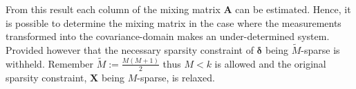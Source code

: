 From this result each column of the mixing matrix $\mathbf{A}$ can be estimated. 
Hence, it is possible to determine the mixing matrix in the case where the measurements transformed into the covariance-domain makes an under-determined system.
Provided however that the necessary sparsity constraint of $\boldsymbol{\delta}$ being $\widetilde{M}$-sparse is withheld. 
Remember $\widetilde{M} := \frac{M(M+1)}{2}$ thus $M < k$ is allowed and the original sparsity constraint, $\mathbf{X}$ being $M$-sparse, is relaxed. 





